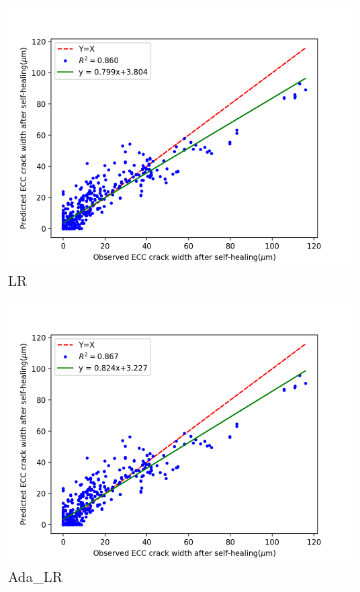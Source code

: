 \documentclass[11pt]{article}
\begin{document}
	
	\begin{figure}[!h]
		\centering
		    \begin{subfigure}{.35\textwidth}
			\centering
			\includegraphics[width = \linewidth]{02LR.png}
			\caption{LR}
		    \end{subfigure}%
		\hspace{-1.4em}
			\begin{subfigure}{.35\textwidth}
		    \centering
		    \includegraphics[width = \linewidth]{02Ada_LR.png}
		    \caption{Ada\_LR}
		    \end{subfigure}%
		\hspace{-1.4em}
		    \begin{subfigure}{.35\textwidth}
		    \centering

\end{subfigure}
\end{figure}
\end{document}
